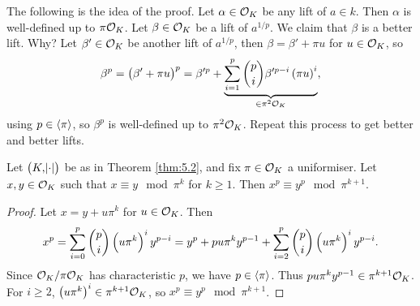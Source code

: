The following is the idea of the proof. Let $ \alpha \in \mathcal{O}_K $ be any lift of $ a \in k $. Then $ \alpha $ is well-defined up to $ \pi\mathcal{O}_K $. Let $ \beta \in \mathcal{O}_K $ be a lift of $ a^{1 / p} $. We claim that $ \beta $ is a better lift. Why? Let $ \beta' \in \mathcal{O}_K $ be another lift of $ a^{1 / p} $, then $ \beta = \beta' + \pi u $ for $ u \in \mathcal{O}_K $, so
$$ \beta^p = \br{\beta' + \pi u}^p = \beta'^p + \underbrace{\sum_{i = 1}^p \binom{p}{i}\beta'^{p - i}\br{\pi u}^i}_{\in \pi^2\OOO_K}, $$
using $ p \in \left\langle \pi \right\rangle $, so $ \beta^p $ is well-defined up to $ \pi^2\mathcal{O}_K $. Repeat this process to get better and better lifts.

\begin{lemma}
\label{lem:5.4}
Let $ \br{K, \abs{\cdot}} $ be as in Theorem \ref{thm:5.2}, and fix $ \pi \in \mathcal{O}_K $ a uniformiser. Let $ x, y \in \mathcal{O}_K $ such that $ x \equiv y \mod \pi^k $ for $ k \ge 1 $. Then $ x^p \equiv y^p \mod \pi^{k + 1} $.
\end{lemma}

\begin{proof}
Let $ x = y + u\pi^k $ for $ u \in \mathcal{O}_K $. Then
$$ x^p = \sum_{i = 0}^p \binom{p}{i}\br{u\pi^k}^iy^{p - i} = y^p + pu\pi^ky^{p - 1} + \sum_{i = 2}^p \binom{p}{i}\br{u\pi^k}^iy^{p - i}. $$
Since $ \mathcal{O}_K / \pi\mathcal{O}_K $ has characteristic $ p $, we have $ p \in \left\langle \pi \right\rangle $. Thus $ pu\pi^ky^{p - 1} \in \pi^{k + 1}\mathcal{O}_K $. For $ i \ge 2 $, $ \br{u\pi^k}^i \in \pi^{k + 1}\OOO_K $, so $ x^p \equiv y^p \mod \pi^{k + 1} $.
\end{proof}

